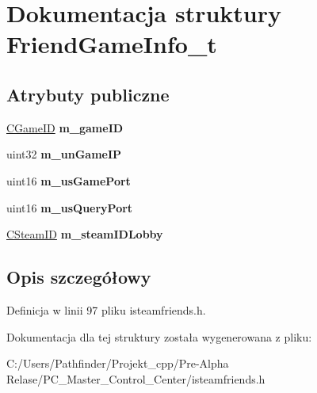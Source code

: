 \hypertarget{struct_friend_game_info__t}{}\section{Dokumentacja struktury Friend\+Game\+Info\+\_\+t}
\label{struct_friend_game_info__t}
\subsection*{Atrybuty publiczne}
\begin{DoxyCompactItemize}
\item 
\mbox{\label{struct_friend_game_info__t_aa5481ff8a25f28f289cc801c9ace4849}} 
\hyperlink{class_c_game_i_d}{C\+Game\+ID} {\bfseries m\+\_\+game\+ID}
\item 
\mbox{\label{struct_friend_game_info__t_ace9620f5cd47c58d573540000b7c0112}} 
uint32 {\bfseries m\+\_\+un\+Game\+IP}
\item 
\mbox{\label{struct_friend_game_info__t_a874f6296ec36db3e4307aa3c94d2b4cc}} 
uint16 {\bfseries m\+\_\+us\+Game\+Port}
\item 
\mbox{\label{struct_friend_game_info__t_a02ea82c47b8ef3083d98aa382864ec3d}} 
uint16 {\bfseries m\+\_\+us\+Query\+Port}
\item 
\mbox{\label{struct_friend_game_info__t_a436683ac4e23a83bdb9f6af834589a4a}} 
\hyperlink{class_c_steam_i_d}{C\+Steam\+ID} {\bfseries m\+\_\+steam\+I\+D\+Lobby}
\end{DoxyCompactItemize}


\subsection{Opis szczegółowy}


Definicja w linii 97 pliku isteamfriends.\+h.



Dokumentacja dla tej struktury została wygenerowana z pliku\+:\begin{DoxyCompactItemize}
\item 
C\+:/\+Users/\+Pathfinder/\+Projekt\+\_\+cpp/\+Pre-\/\+Alpha Relase/\+P\+C\+\_\+\+Master\+\_\+\+Control\+\_\+\+Center/isteamfriends.\+h\end{DoxyCompactItemize}

